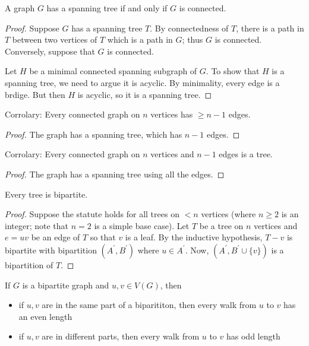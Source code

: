 \documentclass[12pt]{article}
\begin{document}
\begin{lemma}
A graph $G$ has a spanning tree if and only if $G$ is connected.
\end{lemma}

\begin{proof}
Suppose $G$ has a spanning tree $T$. By connectedness of $T$, there is a path in $T$ between two vertices of $T$ which is a path in $G$; thus $G$ is connected. Conversely, suppose that $G$ is connected.

Let $H$ be a minimal connected spanning subgraph of $G$. To show that $H$ is a spanning tree, we need to argue it is acyclic. By minimality, every edge is a brdige. But then $H$ is acyclic, so it is a spanning tree.
\end{proof}

\begin{lemma}
Corrolary: Every connected graph on $n$ vertices has $\geq n-1$ edges.
\end{lemma}

\begin{proof}
The graph has a spanning tree, which has $n-1$ edges.
\end{proof}

\begin{lemma}
Corrolary: Every connected graph on $n$ vertices and $n-1$ edges is a tree.
\end{lemma}

\begin{proof}
The graph has a spanning tree using all the edges.
\end{proof}

\begin{theorem}
\label{bipartiteTrees}
Every tree is bipartite.
\end{theorem}

\begin{proof}
Suppose the statute holds for all trees on $<n$ vertices (where $n\geq 2$ is an integer; note that $n=2$ is a simple base case). Let $T$ be a tree on $n$ vertices and $e=uv$ be an edge of $T$ so that $v$ is a leaf. By the inductive hypothesis, $T-v$ is bipartite with bipartition $(A^\prime, B^\prime)$ where $u \in A^\prime$. Now, $(A^\prime, B^\prime \cup \{v\})$ is a bipartition of $T$.
\end{proof}

\begin{lemma}
\label{bipartiteWalkLengths}
If $G$ is a bipartite graph and $u,v \in V(G)$, then
\begin{itemize}
\item if $u,v$ are in the same part of a biparititon, then every walk from $u$ to $v$ has an even length
\item if $u,v$ are in different parts, then every walk from $u$ to $v$ has odd length
\end{itemize}
\end{lemma}
\end{document}
